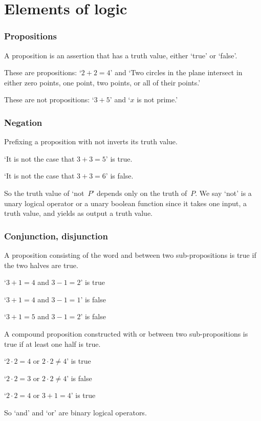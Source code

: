 \documentclass[10pt,t]{beamer}
\begin{document}
\section{Elements of logic}

\begin{frame}
  \frametitle{Propositions}

A \alert{proposition} is an assertion that has a truth value, 
either `true' or `false'.

\pause
These are propositions: `$2+2=4$' 
and `Two circles in the plane intersect in either zero points, one point,
two points, or all of their points.'

\pause
These are not propositions: `$3+5$'
and `$x$ is not prime.'
\end{frame}



\begin{frame}[<+->]
  \frametitle{Negation}

Prefixing a proposition with \alert{not} inverts its truth value.

`It is not the case that $3+3=5$'
is true.

`It is not the case that $3+3=6$'
is false.

\pause
\bigskip
So the truth value
of `not~$P$' depends only on the truth of~$P$.
We say `not' is a \alert{unary logical operator} or 
a \alert{unary boolean function} since it takes one input, a truth value, 
and yields as output a truth value.


\end{frame}


\begin{frame}
  \frametitle{Conjunction, disjunction}

A proposition consisting of the word \alert{and}
between two sub-propositions is true if
the two halves are true.

`$3+1=4$ and 
$3-1=2$'
is true

`$3+1=4$ and 
$3-1=1$'
is false

`$3+1=5$ and 
$3-1=2$'
is false

\pause
\bigskip
A compound proposition constructed with \alert{or}
between two sub-propositions is true if at least one half
is true.

`$2\cdot 2=4$ or 
$2\cdot 2\neq 4$'
is true

`$2\cdot 2=3$ or 
$2\cdot 2\neq 4$'
is false

`$2\cdot 2=4$ or 
$3+1=4$'
is true

\bigskip
\pause
So
`and' and `or'
are \alert{binary logical operators}.
\end{frame}
\end{document}

